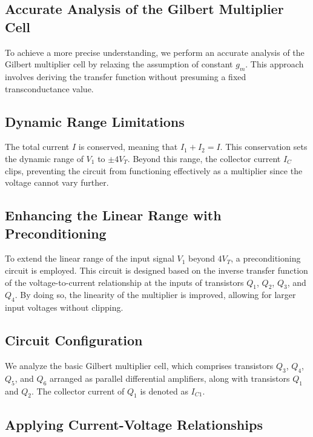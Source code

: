 \documentclass[a4paper,9pt,twoside,openany,twocolumn]{memoir}
\begin{document}
\subsection{Accurate Analysis of the Gilbert Multiplier Cell}

To achieve a more precise understanding, we perform an accurate analysis of the Gilbert multiplier cell by relaxing the assumption of constant \( g_m \). This approach involves deriving the transfer function without presuming a fixed transconductance value.

\subsection{Dynamic Range Limitations}

The total current \( I \) is conserved, meaning that \( I_1 + I_2 = I \). This conservation sets the dynamic range of \( V_1 \) to \( \pm 4V_T \). Beyond this range, the collector current \( I_C \) clips, preventing the circuit from functioning effectively as a multiplier since the voltage cannot vary further.

\subsection{Enhancing the Linear Range with Preconditioning}

To extend the linear range of the input signal \( V_1 \) beyond \( 4V_T \), a preconditioning circuit is employed. This circuit is designed based on the inverse transfer function of the voltage-to-current relationship at the inputs of transistors \( Q_1 \), \( Q_2 \), \( Q_3 \), and \( Q_4 \). By doing so, the linearity of the multiplier is improved, allowing for larger input voltages without clipping.

\subsection{Circuit Configuration}

We analyze the basic Gilbert multiplier cell, which comprises transistors \( Q_3 \), \( Q_4 \), \( Q_5 \), and \( Q_6 \) arranged as parallel differential amplifiers, along with transistors \( Q_1 \) and \( Q_2 \). The collector current of \( Q_1 \) is denoted as \( I_{C1} \).

\subsection{Applying Current-Voltage Relationships}
\end{document}
